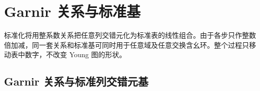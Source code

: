 \section{Garnir 关系与标准基}
\label{b5:sec:0603}

标准化将用整系数关系把任意列交错元化为标准表的线性组合。由于各步只作整数倍加减，同一套关系和标准基可同时用于任意域及任意交换含幺环。整个过程只移动表中数字，不改变 Young 图的形状。

\subsection{Garnir 关系与标准列交错元基}
\label{b5:subsec:0603:01}

